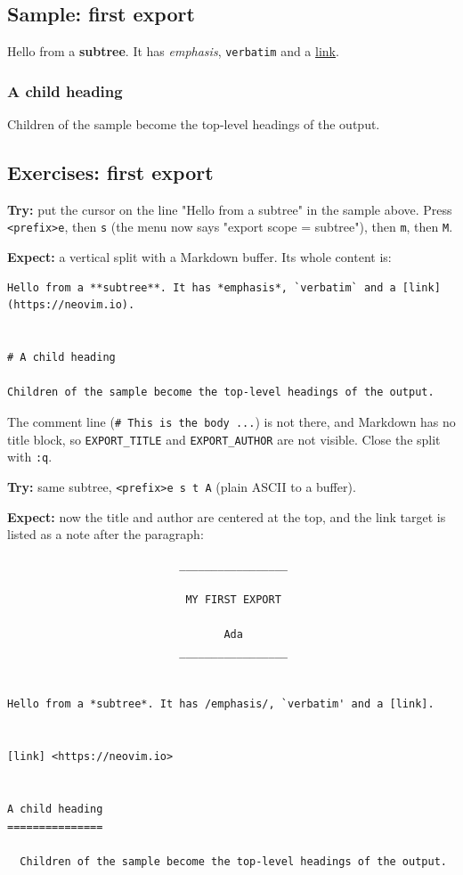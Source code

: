 \subsection{Sample: first export}
\label{sec:orgd42c180}
Hello from a \textbf{subtree}. It has \emph{emphasis}, \texttt{verbatim} and a \href{https://neovim.io}{link}.
\subsubsection{A child heading}
\label{sec:org8457a29}
Children of the sample become the top-level headings of the output.
\subsection{Exercises: first export}
\label{sec:orgbc77e6e}
\textbf{Try:} put the cursor on the line "Hello from a subtree" in the sample
above. Press \texttt{<prefix>e}, then \texttt{s} (the menu now says "export scope =
subtree"), then \texttt{m}, then \texttt{M}.

\textbf{Expect:} a vertical split with a Markdown buffer. Its whole content is:

\begin{verbatim}
Hello from a **subtree**. It has *emphasis*, `verbatim` and a [link](https://neovim.io).


# A child heading

Children of the sample become the top-level headings of the output.
\end{verbatim}

The comment line (\texttt{\# This is the body ...}) is not there, and Markdown has
no title block, so \texttt{EXPORT\_TITLE} and \texttt{EXPORT\_AUTHOR} are not visible.
Close the split with \texttt{:q}.

\textbf{Try:} same subtree, \texttt{<prefix>e s t A} (plain ASCII to a buffer).

\textbf{Expect:} now the title and author are centered at the top, and the link
target is listed as a note after the paragraph:

\begin{verbatim}
                           _________________

                            MY FIRST EXPORT

                                  Ada
                           _________________


Hello from a *subtree*. It has /emphasis/, `verbatim' and a [link].


[link] <https://neovim.io>


A child heading
===============

  Children of the sample become the top-level headings of the output.
\end{verbatim}

